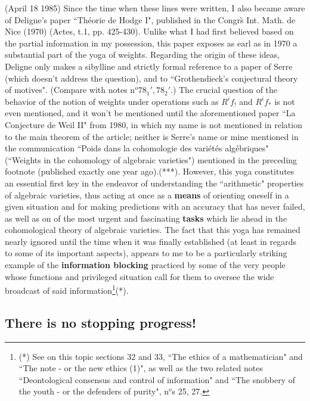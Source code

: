 {(April 18 1985) Since the time when these lines were written, I also became aware of Deligne's paper ``Th\'eorie de Hodge I", published in the Congr\`s Int. Math. de Nice (1970) (Actes, t.1, pp. 425-430). Unlike what I had first believed based on the partial information in my possession, this paper exposes as earl as in 1970 a substantial part of the yoga of weights. Regarding the origin of these ideas, Deligne only makes a sibylline and strictly formal reference to a paper of Serre (which doesn't address the question), and to ``Grothendieck's conjectural theory of motives". (Compare with notes n$^o 78_1', 78_2'$.) The crucial question of the behavior of the notion of weights under operations such as $R^if_!$ and $R^if_*$ is not even mentioned, and it won't be mentioned until the aforementioned paper ``La Conjecture de Weil II" from 1980, in which my name is not mentioned in relation to the main theorem of the article; neither is Serre's name or mine mentioned in the communication ``Poids dans la cohomologie des vari\'et\'es alg\'ebriques" (``Weights in the cohomology of algebraic varieties") mentioned in the preceding footnote (published exactly one year ago).}(***). However, this yoga constitutes an essential first key in the endeavor of understanding the ``arithmetic" properties of algebraic varieties, thus acting at once as a \textbf{means} of orienting oneself in a given situation and for making predictions with an accuracy that has never failed, as well as on of the most urgent and fascinating \textbf{tasks} which lie ahead in the cohomological theory of algebraic varieties. The fact that this yoga has remained nearly ignored until the time when it was finally established (at least in regards to some of its important aspects), appears to me to be a particularly striking example of the \textbf{information blocking} practiced by some of the very people whose functions and privileged situation call for them to oversee the wide broadcast of said information\footnote{(*) See on this topic sections 32 and 33, ``The ethics of a mathematician" and ``The note - or the new ethics (1)", as well as the two related notes ``Deontological consensus and control of information" and ``The snobbery of the youth - or the defenders of purity", n$^o$s 25, 27.}(*).

\subsection{There is no stopping progress!}

